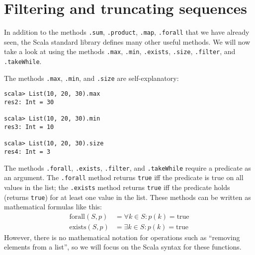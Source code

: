 \section{Filtering and truncating sequences}

In addition to the methods \lstinline!.sum!,
\lstinline!.product!, \lstinline!.map!,
\texttt{}\lstinline!.forall!
that we have already seen, the Scala standard library defines many
other useful methods. We will now take a look at using the methods
\lstinline!.max!, \lstinline!.min!,
\lstinline!.exists!, \lstinline!.size!,
\lstinline!.filter!, and
\lstinline!.takeWhile!. 

The methods \lstinline!.max!,
\lstinline!.min!, and \texttt{}\lstinline!.size!
are self-explanatory:
\begin{lstlisting}
scala> List(10, 20, 30).max
res2: Int = 30

scala> List(10, 20, 30).min
res3: Int = 10

scala> List(10, 20, 30).size
res4: Int = 3
\end{lstlisting}
The methods \lstinline!.forall!,
\lstinline!.exists!, \lstinline!.filter!,
and \texttt{}\lstinline!.takeWhile!
require a predicate as an argument. The \texttt{}\lstinline!.forall!
method returns \texttt{}\lstinline!true!
iff the predicate is true on all values in the list; the \texttt{}\lstinline!.exists!
method returns \texttt{}\lstinline!true!
iff the predicate holds (returns \lstinline!true!)
for at least one value in the list. These methods can be written as
mathematical formulas like this:
\begin{align*}
\text{forall}\left(S,p\right) & =\forall k\in S:p(k)=\text{true}\\
\text{exists}\left(S,p\right) & =\exists k\in S:p(k)=\text{true}
\end{align*}
However, there is no mathematical notation for operations such as
``removing elements from a list'', so we will focus on the Scala
syntax for these functions.

